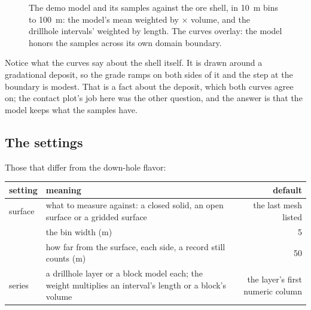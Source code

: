 \begin{figure}[htbp]\centering
{}
\caption{The demo model and its samples against the ore shell, in 10~m bins to 100~m: the model's mean  weighted by  × volume, and the drillhole intervals' weighted by length. The curves overlay: the model honors the samples across its own domain boundary.}\label{fig:contact-shell}
\end{figure}

Notice what the curves say about the shell itself. It is drawn around a gradational deposit, so the grade ramps on both sides of it and the step at the boundary is modest. That is a fact about the deposit, which both curves agree on; the contact plot's job here was the other question, and the answer is that the model keeps what the samples have.

\subsection{The settings}
Those that differ from the down-hole flavor:

\medskip
\begin{tabularx}{\linewidth}{@{}lMD@{}}\toprule
setting & meaning & default \\ \midrule
surface & what to measure against: a closed solid, an open surface or a gridded surface & the last mesh listed \\
 & the bin width (m) & 5 \\
 & how far from the surface, each side, a record still counts (m) & 50 \\
series & a drillhole layer or a block model each; the weight multiplies an interval's length or a block's volume & the layer's first numeric column \\ \bottomrule
\end{tabularx}
\medskip

